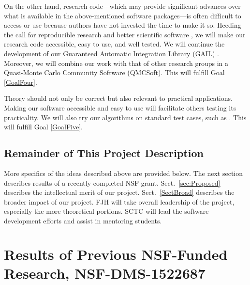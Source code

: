 \documentclass[11pt]{NSFamsart}
\begin{document}
On the other hand, research code---which may provide significant advances over what is available in the above-mentioned software packages---is often difficult to access or use because authors have not invested the time to make it so.  Heeding the call for reproducible research \cite{BaiBor12a, Pen11, Sto14a} and better scientific software \cite{BSS18}, we will make our research code accessible, easy to use, and well tested.  We will continue the development of our Guaranteed Automatic Integration Library \hypertarget{GAILlink}{(GAIL)} \cite{ChoEtal17b}.  Moreover, we will combine our work with that of other research groups in a Quasi-Monte Carlo Community Software \hypertarget{QMCSoftlink}{(QMCSoft)}.  This will fulfill Goal \ref{GoalFour}.

Theory should not only be correct but also relevant to practical applications.  Making our software accessible and easy to use will facilitate others testing its practicality.  We will also try our algorithms on standard test cases, such as \cite{VirLib17a}.  This will fulfill Goal \ref{GoalFive}.

\subsection{Remainder of This Project Description}

More specifics of the ideas described above are provided below.  The next section describes results of a recently completed NSF grant.  Sect.\ \ref{sec:Proposed} describes the intellectual merit of our project.  Sect.\ \ref{SectBroad} describes the broader impact of our project.  FJH will take overall leadership of the project, especially the more theoretical portions.  SCTC will lead the software development efforts and assist in mentoring students.

\section{Results of Previous NSF-Funded Research,
NSF-DMS-1522687} \label{sec:Previous}
\end{document}
